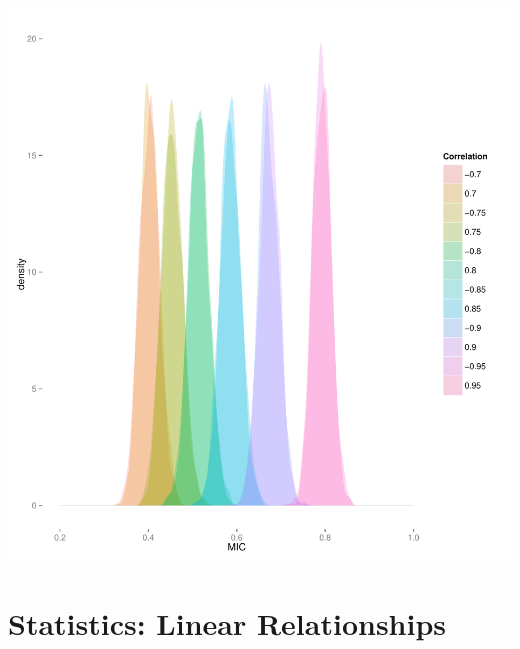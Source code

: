 \documentclass[english,nohyper,titlepage]{tufte-handout}\usepackage{graphicx, color}
\begin{document}
\vspace{.25cm}
\includegraphics[scale=.30]{images/MICDensitiesHiCorr}


\section{Statistics: Linear Relationships}\label{sec:linrel}
 
\end{document}
